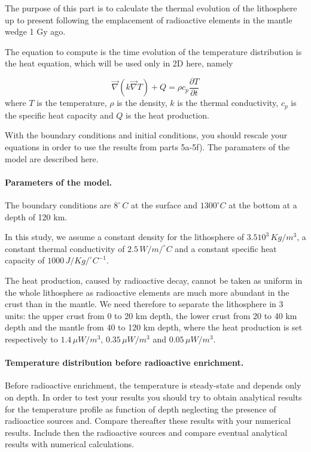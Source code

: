 \documentclass[%
oneside,                 %
final,                   %
10pt]{article}
\begin{document}
The purpose of this part is to 
calculate the thermal evolution of the lithosphere up to present following the emplacement of radioactive elements in the mantle wedge 1 Gy ago.

The equation to compute is the time evolution of the temperature distribution is the heat equation, which will be used only in 2D here, namely

\begin{equation}
\vec \nabla(k \vec \nabla T) + Q = \rho c_p \frac{\partial T}{\partial t} 
\label{eq:heat2D}
\end{equation}
where $T$ is the temperature, $\rho$ is the density, $k$ is the thermal conductivity, $c_p$ is the specific heat capacity and $Q$ is the heat production.

With the boundary conditions and initial conditions, you should rescale your equations in order to use the results from parts 5a-5f). The paramaters of the model are described here.

\paragraph{Parameters of the model.}
The boundary conditions are $8^{\circ}\,C$ at the surface and $1300^{\circ}C$ at the bottom at a depth of 120 km.

In this study, we assume a constant density for the lithosphere of $3.5 10^3\,Kg/m^3$,
a constant thermal conductivity of $2.5\,W/m/^{\circ}C$
and a constant specific heat capacity of $1000\,J/Kg/^{\circ}C^{-1}$.

The heat production, caused by radioactive decay, cannot be taken as uniform in the whole lithosphere as radioactive elements are much more abundant in the crust than in the mantle.
We need therefore to separate the lithosphere in 3 units: the upper crust from 0 to 20 km depth, the lower crust from 20 to 40 km depth and the mantle from 40 to 120 km depth, where the heat production is set respectively to $1.4\,\mu W/m^3$, $0.35\,\mu W/m^3$ and $0.05\,\mu W/m^3$. 

\paragraph{Temperature distribution before radioactive enrichment.}
Before radioactive enrichment, the temperature is steady-state and depends only on depth. In order to test your results you should
try to obtain analytical results for  the temperature profile as function of depth neglecting the presence of radioactice sources and. Compare thereafter these results with your numerical results.  Include then the radioactive sources and compare eventual analytical results with numerical calculations.
\end{document}
